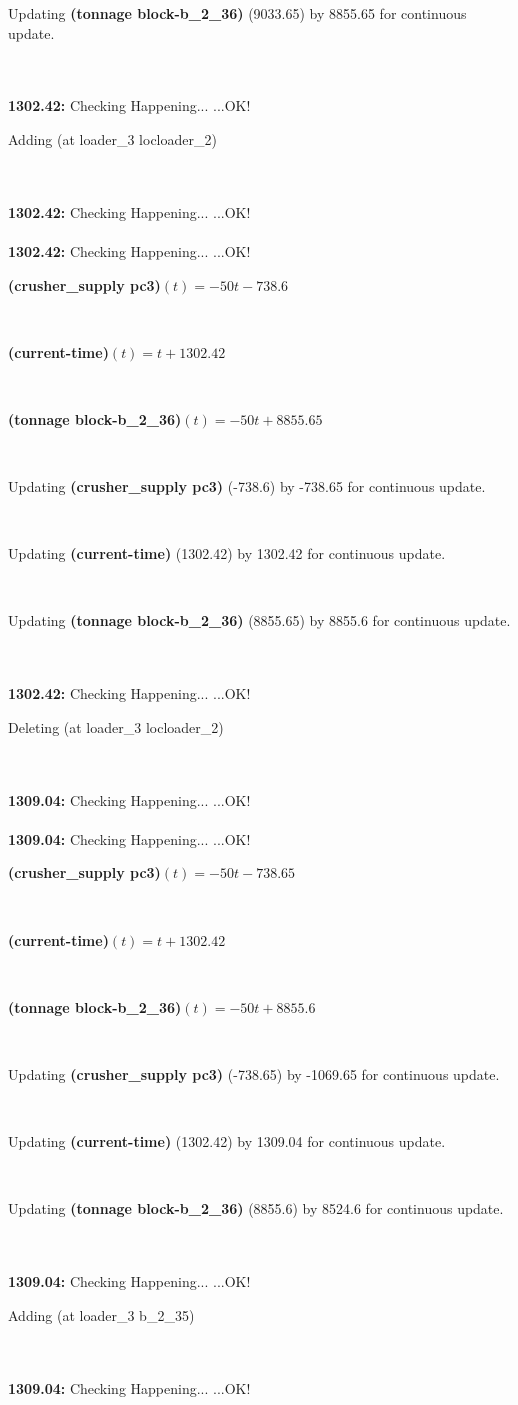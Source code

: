 \documentclass[a4paper,12pt]{article}
\newcommand{\atime}[1]{{\bf #1:}}
\newcommand{\exprn}[1]{{\sf #1}}
\newcommand{\fexprn}[1]{{\small {\bf #1}}}
\newcommand{\checkhappening}{Checking Happening... }
\newcommand{\listrow}[1]{\begin{minipage}[t]{11.5cm} #1 \end{minipage}}
\newcommand{\happeningOK}{...OK!}
\newcommand{\assignmentcts}[3]{\listrow{Updating \fexprn{#1} (#2) by #3 for continuous update.}}
\newcommand{\function}[2]{\listrow{\fexprn{#1}$(t) = #2$}}
\newcommand{\adding}[1]{\listrow{Adding \exprn{#1} }}
\newcommand{\deleting}[1]{\listrow{Deleting \exprn{#1} }}
\begin{document}
\begin{tabbing}
 \> \assignmentcts{(tonnage block-b\_2\_36)}{9033.65}{8855.65}\\
\\
\atime{1302.42} \> \checkhappening\happeningOK\\
 \> \adding{(at loader\_3 locloader\_2)}\\
\\
\atime{1302.42} \> \checkhappening\happeningOK\\
\\
\atime{1302.42} \> \checkhappening\happeningOK\\
 \> \function{(crusher\_supply pc3)}{ - 50t - 738.6}\\
 \> \function{(current-time)}{t + 1302.42}\\
 \> \function{(tonnage block-b\_2\_36)}{ - 50t + 8855.65}\\
 \> \assignmentcts{(crusher\_supply pc3)}{-738.6}{-738.65}\\
 \> \assignmentcts{(current-time)}{1302.42}{1302.42}\\
 \> \assignmentcts{(tonnage block-b\_2\_36)}{8855.65}{8855.6}\\
\\
\atime{1302.42} \> \checkhappening\happeningOK\\
 \> \deleting{(at loader\_3 locloader\_2)}\\
\\
\atime{1309.04} \> \checkhappening\happeningOK\\
\\
\atime{1309.04} \> \checkhappening\happeningOK\\
 \> \function{(crusher\_supply pc3)}{ - 50t - 738.65}\\
 \> \function{(current-time)}{t + 1302.42}\\
 \> \function{(tonnage block-b\_2\_36)}{ - 50t + 8855.6}\\
 \> \assignmentcts{(crusher\_supply pc3)}{-738.65}{-1069.65}\\
 \> \assignmentcts{(current-time)}{1302.42}{1309.04}\\
 \> \assignmentcts{(tonnage block-b\_2\_36)}{8855.6}{8524.6}\\
\\
\atime{1309.04} \> \checkhappening\happeningOK\\
 \> \adding{(at loader\_3 b\_2\_35)}\\
\\
\atime{1309.04} \> \checkhappening\happeningOK\\
\\

\end{tabbing}
\end{document}
